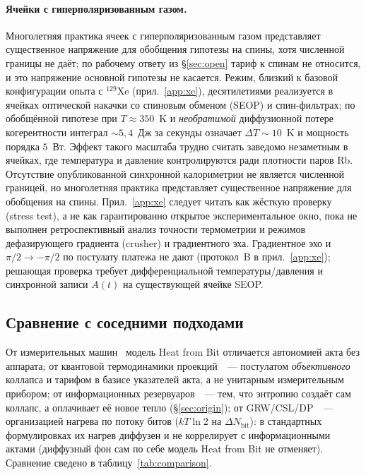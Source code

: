 \documentclass[11pt,a4paper]{article}
\newcommand{\Sref}[1]{\hyperref[#1]{\S\ref{#1}}}
\begin{document}
\paragraph{Ячейки с гиперполяризованным газом.}
Многолетняя практика ячеек с гиперполяризованным газом представляет существенное напряжение для обобщения гипотезы на спины, хотя численной границы не даёт; по рабочему ответу из \Sref{sec:open} тариф к спинам не относится, и это напряжение основной гипотезы не касается. Режим, близкий к базовой конфигурации опыта с $^{129}$Xe (прил.~\ref{app:xe}), десятилетиями реализуется в ячейках оптической накачки со спиновым обменом (SEOP) и спин-фильтрах; по обобщённой гипотезе при $T \approx 350$~K и \emph{необратимой} диффузионной потере когерентности интеграл $\sim 5{,}4$~Дж за секунды означает $\Delta T\sim10$~K и мощность порядка $5$~Вт. Эффект такого масштаба трудно считать заведомо незаметным в ячейках, где температура и давление контролируются ради плотности паров Rb. Отсутствие опубликованной синхронной калориметрии не является численной границей, но многолетняя практика представляет существенное напряжение для обобщения на спины. Прил.~\ref{app:xe} следует читать как жёсткую проверку (stress test), а не как гарантированно открытое экспериментальное окно, пока не выполнен ретроспективный анализ точности термометрии и режимов дефазирующего градиента (crusher) и градиентного эха. Градиентное эхо и $\pi/2\to-\pi/2$ по постулату платежа не дают (протокол~B в прил.~\ref{app:xe}); решающая проверка требует дифференциальной температуры/давления и синхронной записи $A(t)$ на существующей ячейке SEOP.

\subsection{Сравнение с соседними подходами}\label{sec:compare}

От измерительных машин~\cite{elouard2017,elouard2018,yi2017,bresque2021,dassonneville2026,nogo2026} модель Heat from Bit отличается автономией акта без аппарата; от квантовой термодинамики проекций~\cite{kammerlander2016}~--- постулатом \emph{объективного} коллапса и тарифом в базисе указателей акта, а не унитарным измерительным прибором; от информационных резервуаров~\cite{mandal2012,mandal2013,deffner2013,ptaszynski2019}~--- тем, что энтропию создаёт сам коллапс, а оплачивает её новое тепло (\Sref{sec:origin}); от GRW/CSL/DP~\cite{bassi2013}~--- организацией нагрева по потоку битов ($kT\ln 2$ на $\Delta N_{\mathrm{bit}}$): в стандартных формулировках их нагрев диффузен и не коррелирует с информационными актами (диффузный фон сам по себе модель Heat from Bit не отменяет). Сравнение сведено в таблицу~\ref{tab:comparison}.
\end{document}
